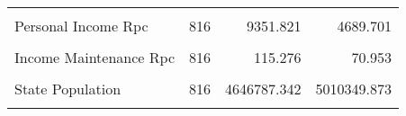 \begin{table}[H]
\begin{tabular}[t]{lrrr}
\cellcolor{gray!6}{Autotheft Crime Rate} & \cellcolor{gray!6}{816} & \cellcolor{gray!6}{410.295} & \cellcolor{gray!6}{231.154}\\
Personal Income Rpc & 816 & 9351.821 & 4689.701\\
\addlinespace
\cellcolor{gray!6}{Unemployment Insurance Rpc} & \cellcolor{gray!6}{816} & \cellcolor{gray!6}{50.019} & \cellcolor{gray!6}{38.081}\\
Income Maintenance Rpc & 816 & 115.276 & 70.953\\
\cellcolor{gray!6}{Retirement Payments Rpc} & \cellcolor{gray!6}{816} & \cellcolor{gray!6}{1002.226} & \cellcolor{gray!6}{546.468}\\
State Population & 816 & 4646787.342 & 5010349.873\\
\cellcolor{gray!6}{Density} & \cellcolor{gray!6}{816} & \cellcolor{gray!6}{355.973} & \cellcolor{gray!6}{1408.250}\\
\bottomrule
\end{tabular}
\end{table}
